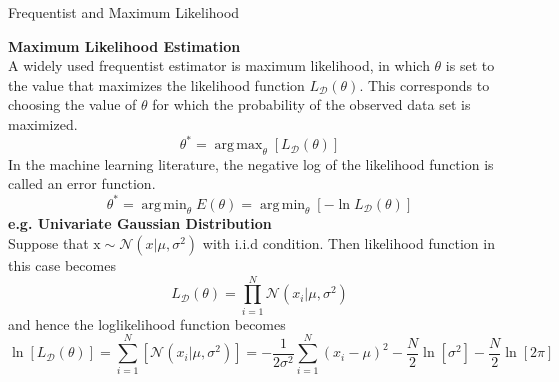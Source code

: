 \documentclass{bredelebeamer}
\DeclareMathOperator*{\argmax}{arg\,max}
\DeclareMathOperator*{\argmin}{arg\,min}
\begin{document}
\begin{frame}{Frequentist and Maximum Likelihood}
  \begin{justify}
    \textbf{Maximum Likelihood Estimation} \\
    A widely used frequentist estimator is maximum likelihood, in which $\theta$
    is set to the value that maximizes the likelihood function $L_{\mathcal{D}} (\theta)$.
    This corresponds to choosing the value of $\theta$ for which the probability of
    the observed data set is maximized.
    \begin{equation}
      \theta^{*} = \argmax_{\theta} [L_{\mathcal{D}} (\theta)]
    \end{equation}
    In the machine learning literature, the negative log of the likelihood function
    is called an error function.
    \begin{equation}
      \theta^{*} = \argmin_{\theta} E(\theta) = \argmin_{\theta} [-\ln L_{\mathcal{D}} (\theta)]
    \end{equation}
    \vspace{\baselineskip}
    \textbf{e.g. Univariate Gaussian Distribution}\\
    Suppose that $\mathrm{x} \sim \mathcal{N}(x|\mu, \sigma^2)$ with \textrm{i.i.d condition}.
    Then likelihood function in this case becomes
    \begin{equation}
      L_{\mathcal{D}} (\theta) = \prod_{i=1}^{N} \mathcal{N}(x_i|\mu, \sigma^2)
    \end{equation}
    and hence the loglikelihood function becomes
    \begin{equation}
      \ln [L_{\mathcal{D}} (\theta)]
        = \sum_{i=1}^{N} [\mathcal{N}(x_i|\mu, \sigma^2)]
        = -\frac{1}{2\sigma^2} \sum_{i=1}^{N} {(x_i - \mu)}^2 - \frac{N}{2} \ln [\sigma^2] -\frac{N}{2} \ln [2\pi]
    \end{equation}
  \end{justify}
\end{frame}
\end{document}
